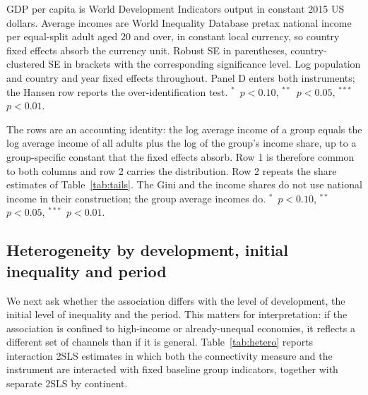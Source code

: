 \documentclass[12pt]{article}
\newcommand{\sym}[1]{\ensuremath{^{#1}}}
\begin{document}
\begin{table}[H]\centering\caption{Growth outcomes: GDP per capita and group average incomes.}\label{tab:growth}
\begin{threeparttable}\small
\begin{tablenotes}\footnotesize\item GDP per capita is World Development Indicators output in constant 2015 US dollars. Average incomes are World Inequality Database pretax national income per equal-split adult aged 20 and over, in constant local currency, so country fixed effects absorb the currency unit. Robust SE in parentheses, country-clustered SE in brackets with the corresponding significance level. Log population and country and year fixed effects throughout. Panel D enters both instruments; the Hansen row reports the over-identification test. \sym{*}~$p<0.10$, \sym{**}~$p<0.05$, \sym{***}~$p<0.01$.\end{tablenotes}\end{threeparttable}\end{table}

\begin{table}[H]\centering\caption{Incidence of the income gain: level and share components (hub connectivity).}\label{tab:growth_decomp}
\begin{threeparttable}\small
\begin{tablenotes}\footnotesize\item The rows are an accounting identity: the log average income of a group equals the log average income of all adults plus the log of the group's income share, up to a group-specific constant that the fixed effects absorb. Row 1 is therefore common to both columns and row 2 carries the distribution. Row 2 repeats the share estimates of Table~\ref{tab:tails}. The Gini and the income shares do not use national income in their construction; the group average incomes do. \sym{*}~$p<0.10$, \sym{**}~$p<0.05$, \sym{***}~$p<0.01$.\end{tablenotes}\end{threeparttable}\end{table}

\subsection{Heterogeneity by development, initial inequality and period}
\label{sec:hetero}
We next ask whether the association differs with the level of development, the initial level of inequality and the period. This matters for interpretation: if the association is confined to high-income or already-unequal economies, it reflects a different set of channels than if it is general. Table~\ref{tab:hetero} reports interaction 2SLS estimates in which both the connectivity measure and the instrument are interacted with fixed baseline group indicators, together with separate 2SLS by continent.
\end{document}
